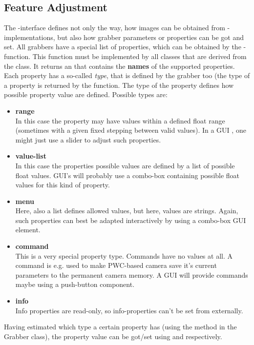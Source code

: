 \subsection{Feature Adjustment\label{sec:grabber-feature-adjustment}}
The -interface  defines not only the way, how images can be obtained from -implementations, but also how grabber parameters or properties can be got and set. All grabbers have a special list of properties, which can be obtained by the -function. This function must be implemented by all classes that are derived from the  class. It returns an  that contains the \textbf{names} of the supported properties. Each property has a so-called \emph{type}, that is defined by the grabber too (the type of a property is returned by the  function. The type of the property defines how possible property value are defined. Possible types are:
\begin{itemize}
\item \textbf{range}\\In this case the property may have values within a defined float range (sometimes with a given fixed stepping between valid values). In a GUI , one might just use a slider to adjust such properties.
\item \textbf{value-list}\\In this case the properties possible values are defined by a list of possible float values. GUI's will probably use a combo-box containing possible float values for this kind of property.
\item \textbf{menu}\\Here, also a list defines allowed values, but here, values are strings. Again, such properties can best be adapted interactively by using a combo-box GUI element.
\item \textbf{command}\\This is a very special property type. Commands have no values at all. A command is e.g. used to make PWC-based camera save it's current parameters to the permanent camera memory. A GUI will provide commands maybe using a push-button component.
\item \textbf{info}\\ Info properties are read-only, so info-properties can't be set from externally.
\end{itemize}
Having estimated which type a certain property has (using the  method in the Grabber class), the property value can be got/set using  and  respectively. 

